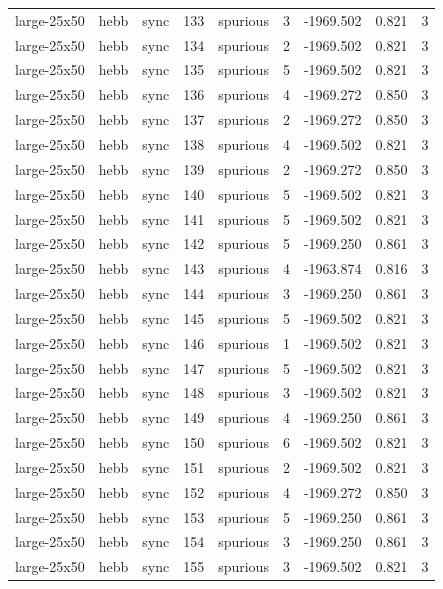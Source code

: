 \begin{tabular}{lllrlrrrr}
large-25x50 & hebb & sync & 133 & spurious & 3 & -1969.502 & 0.821 & 3 \\
large-25x50 & hebb & sync & 134 & spurious & 2 & -1969.502 & 0.821 & 3 \\
large-25x50 & hebb & sync & 135 & spurious & 5 & -1969.502 & 0.821 & 3 \\
large-25x50 & hebb & sync & 136 & spurious & 4 & -1969.272 & 0.850 & 3 \\
large-25x50 & hebb & sync & 137 & spurious & 2 & -1969.272 & 0.850 & 3 \\
large-25x50 & hebb & sync & 138 & spurious & 4 & -1969.502 & 0.821 & 3 \\
large-25x50 & hebb & sync & 139 & spurious & 2 & -1969.272 & 0.850 & 3 \\
large-25x50 & hebb & sync & 140 & spurious & 5 & -1969.502 & 0.821 & 3 \\
large-25x50 & hebb & sync & 141 & spurious & 5 & -1969.502 & 0.821 & 3 \\
large-25x50 & hebb & sync & 142 & spurious & 5 & -1969.250 & 0.861 & 3 \\
large-25x50 & hebb & sync & 143 & spurious & 4 & -1963.874 & 0.816 & 3 \\
large-25x50 & hebb & sync & 144 & spurious & 3 & -1969.250 & 0.861 & 3 \\
large-25x50 & hebb & sync & 145 & spurious & 5 & -1969.502 & 0.821 & 3 \\
large-25x50 & hebb & sync & 146 & spurious & 1 & -1969.502 & 0.821 & 3 \\
large-25x50 & hebb & sync & 147 & spurious & 5 & -1969.502 & 0.821 & 3 \\
large-25x50 & hebb & sync & 148 & spurious & 3 & -1969.502 & 0.821 & 3 \\
large-25x50 & hebb & sync & 149 & spurious & 4 & -1969.250 & 0.861 & 3 \\
large-25x50 & hebb & sync & 150 & spurious & 6 & -1969.502 & 0.821 & 3 \\
large-25x50 & hebb & sync & 151 & spurious & 2 & -1969.502 & 0.821 & 3 \\
large-25x50 & hebb & sync & 152 & spurious & 4 & -1969.272 & 0.850 & 3 \\
large-25x50 & hebb & sync & 153 & spurious & 5 & -1969.250 & 0.861 & 3 \\
large-25x50 & hebb & sync & 154 & spurious & 3 & -1969.250 & 0.861 & 3 \\
large-25x50 & hebb & sync & 155 & spurious & 3 & -1969.502 & 0.821 & 3 \\

\end{tabular}
